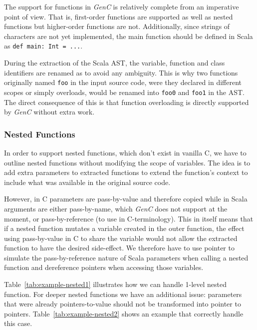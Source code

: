\documentclass{article}
\newcommand{\inlineScala}[1]{\lstinline[language=MyScala]|#1|}
\newcommand{\GenC}{\emph{GenC}\xspace}
\begin{document}
The support for functions in \GenC is relatively complete from an imperative
point of view. That is, first-order functions are supported as well as nested
functions but higher-order functions are not. Additionally, since strings of
characters are not yet implemented, the main function should be defined in Scala
as \inlineScala{def main: Int = ...}.

During the extraction of the Scala AST, the variable, function and class
identifiers are renamed as to avoid any ambiguity. This is why two functions
originally named \inlineScala{foo} in the input source code, were they declared
in different scopes or simply overloads, would be renamed into
\inlineScala{foo0} and \inlineScala{foo1} in the AST. The direct consequence of
this is that function overloading is directly supported by \GenC without extra
work.



\subsubsection{Nested Functions}

In order to support nested functions, which don't exist in vanilla C, we have to
outline nested functions without modifying the scope of variables. The idea is
to add extra parameters to extracted functions to extend the function's context
to include what was available in the original source code.

However, in C parameters are pass-by-value and therefore copied while in Scala
arguments are either pass-by-name, which \GenC does not support at the moment,
or pass-by-reference (to use in C-terminology). This in itself means that if a
nested function mutates a variable created in the outer function, the effect
using pass-by-value in C to share the variable would not allow the extracted
function to have the desired side-effect. We therefore have to use pointer to
simulate the pass-by-reference nature of Scala parameters when calling a nested
function and dereference pointers when accessing those variables.

Table~\ref{tab:example-nested1} illustrates how we can handle 1-level nested
function. For deeper nested functions we have an additional issue: parameters
that were already pointers-to-value should not be transformed into pointer to
pointers. Table~\ref{tab:example-nested2} shows an example that correctly handle
this case.
\end{document}
